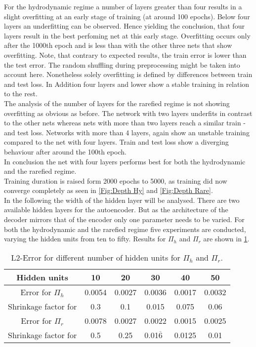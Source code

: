 For the hydrodynamic regime a number of layers greater than four results in a slight overfitting at an early stage of training (at around 100 epochs). Below four layers an underfitting can be observed. Hence yielding the conclusion, that four layers result in the best perfoming net at this early stage. Overfitting occurs only after the 1000th epoch and is less than with the other three nets that show overfitting. Note, that contrary to expected results, the train error is lower than the test error. The random shuffling during preprocessing might be taken into account here. Nonetheless solely overfitting is defined by differences between train and test loss. In Addition four layers and lower show a stable training in relation to the rest.\\
The analysis of the number of layers for the rarefied regime is not showing overfitting as obvious as before. The network with two layers underfits in contrast to the other nets whereas nets with more than two layers reach a similar train - and test loss. Networks with more than 4 layers, again show an unstable training compared to the net with four layers. Train and test loss show a diverging behaviour after around the 100th epoch.\\
In conclusion the net with four layers performs best for both the hydrodynamic and the rarefied regime.\\
Training duration is raised form 2000 epochs to 5000, as training did now converge completely as seen in \cref{Fig:Depth Hy} and \cref{Fig:Depth Rare}.\\
In the following the width of the hidden layer will be analysed. There are two available hidden layers for the autoencoder. But as the architecture of the decoder mirrors that of the encoder only one parameter needs to be varied. For both the hydrodynamic and the rarefied regime five experiments are conducted, varying the hidden units from ten to fifty. Results for \(\Pi_h\) and \(\Pi_r\) are shown in \cref{Tab:Hidden Units}.
\begin{table}[!htbp]\centering
	\begin{tabular}{ |c|c|c|c|c|c| }
		\hline
		Hidden units & 10 & 20 & 30  & 40 & 50 \\ [.5ex]
		\hline
		Error for \(\Pi_h\) & 0.0054 & 0.0027 & 0.0036 & 0.0017 & 0.0032\\ \hline
		Shrinkage factor for \hy & 0.3 & 0.1 & 0.015 & 0.075 & 0.06\\ \hline
		Error for \(\Pi_r\)& 0.0078 & 0.0027 & 0.0022 & 0.0015 & 0.0025\\ \hline
		Shrinkage factor for \rare & 0.5 & 0.25 & 0.01$\overline{6}$\ & 0.0125 & 0.01\\ \hline
	\end{tabular}
	\caption{L2-Error for different number of hidden units for \(\Pi_h\) and \(\Pi_r\).}
	\label{Tab:Hidden Units}
\end{table}
